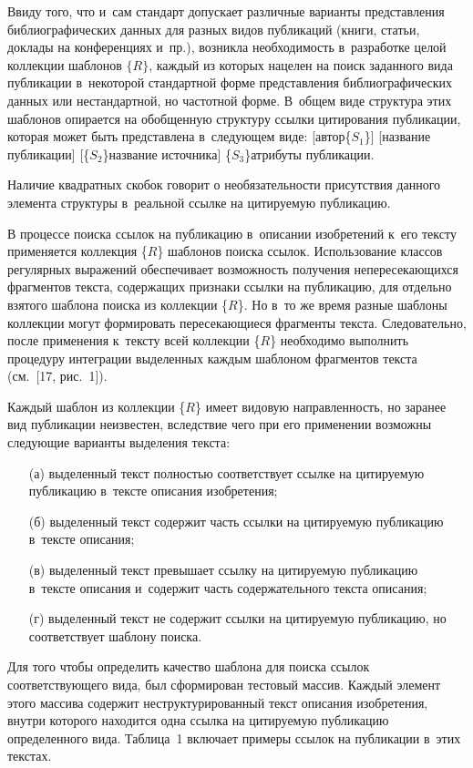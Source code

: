 \begin{multicols}{2}
  Ввиду того, что и~сам стандарт допускает различные варианты представления
библиографических данных для разных видов публикаций (книги, статьи, доклады на
конференциях и~пр.), воз\-ник\-ла необходимость в~разработке целой коллекции шаб\-ло\-нов
$\{R\}$, каждый из которых нацелен на поиск заданного вида публикации в~некоторой стандартной форме представления библиографических данных или
нестандартной, но частотной форме. В~общем виде структура этих шаб\-ло\-нов опирается на
обобщенную структуру ссылки цитирования пуб\-ли\-ка\-ции, которая может быть представлена
в~следующем виде:
 [автор\{$S_1$\}] [название публикации] [\{$S_2$\}название источника] \{$S_3$\}атрибуты
публикации.

  Наличие квадратных скобок говорит о необязательности присутствия данного элемента
структуры в~реальной ссылке на цитируемую публикацию.

  В процессе поиска ссылок на публикацию в~описании изобретений к~его тексту
применяется коллекция \{$R$\} шаблонов поиска ссылок. Использование классов регулярных
выражений обеспечивает возможность получения непересекающихся фрагментов текста,
содержащих признаки ссылки на пуб\-ли\-ка\-цию, для отдельно взятого шаблона поиска из
коллекции \{$R$\}. Но в~то же время разные шаблоны коллекции могут формировать
пересекающиеся фрагменты текста. Следовательно, после применения к~тексту всей
коллекции \{$R$\} необходимо выполнить процедуру интеграции выделенных каждым
шаблоном фрагментов текста (см.~[17, рис.~1]).

  Каждый шаблон из коллекции \{$R$\} имеет видовую направленность, но заранее вид
публикации неизвестен, вследствие чего при его применении возможны следующие
варианты выделения текста:
  \begin{itemize}
\item[(а)] выделенный текст полностью соответствует ссылке на цитируемую
публикацию в~тексте описания изобретения;
\item[(б)] выделенный текст содержит часть ссылки на цитируемую публикацию в~тексте описания;
\item[(в)] выделенный текст превышает ссылку на цитируемую публикацию в~тексте
описания и~содержит часть содержательного текста описания;
\item[(г)] выделенный текст не содержит ссылки на цитируемую публикацию, но
соответствует шаблону поиска.
\end{itemize}

  Для того чтобы определить качество шаблона для поиска ссылок соответствующего вида,
был сформирован тестовый массив. Каждый элемент этого массива содержит
неструктурированный текст описания изобретения, внутри которого находится одна ссылка
на цитируемую публикацию определенного вида. Таблица~1 включает примеры ссылок на
публикации в~этих текстах.


\end{multicols}
